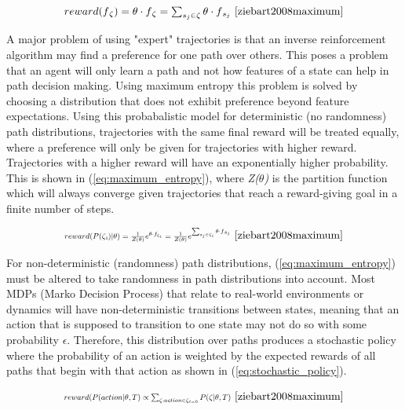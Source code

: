 \documentclass[12pt,american]{report}
\begin{document}
\begin{equation}
            \label{eq:feature_count_reward}
            \resizebox{0.44\textwidth}{!}{$reward(f\textsubscript{$\zeta$})= \theta \cdot f\textsubscript{$\zeta$} = \sum_{s_j\in\zeta}^{}\theta \cdot f\textsubscript{$s_j$}$}~\cite{ziebart2008maximum}
        \end{equation}

A major problem of using "expert" trajectories is that an inverse reinforcement algorithm may find a preference for one path over others.  This poses a problem that an agent will only learn a path and not how features of a state can help in path decision making.  Using maximum entropy this problem is solved by choosing a distribution that does not exhibit preference beyond feature expectations.  Using this probabalistic model for deterministic (no randomness) path distributions, trajectories with the same final reward will be treated equally, where a preference will only be given for trajectories with higher reward.  Trajectories with a higher reward will have an exponentially higher probability. This is shown in (\ref{eq:maximum_entropy}), where \textit{Z($\theta$)} is the partition function which will always converge given trajectories that reach a reward-giving goal in a finite number of steps.

\begin{equation}
            \label{eq:maximum_entropy}
            \resizebox{0.44\textwidth}{!}{$reward(P(\zeta\textsubscript{i})|\theta)= \frac{1}{Z(\theta)} e^{\theta \cdot f_{\zeta_i}}=  \frac{1}{Z(\theta)} e^{\sum_{s_j\in\zeta_i}^{}\theta \cdot f\textsubscript{$s_j$}}$}~\cite{ziebart2008maximum}%
        \end{equation}

For non-deterministic (randomness) path distributions, (\ref{eq:maximum_entropy}) must be altered to take randomness in path distributions into account. Most MDPs (Marko Decision Process) that relate to real-world environments or dynamics will have non-deterministic transitions between states, meaning that an action that is supposed to transition to one state may not do so with some probability $\epsilon$.  Therefore, this distribution over paths produces a stochastic policy where the probability of an action is weighted by the expected rewards of all paths that begin with that action as shown in (\ref{eq:stochastic_policy}).

\begin{equation}
            \label{eq:stochastic_policy}
            \resizebox{0.44\textwidth}{!}{$reward(P(action | \theta, T) \propto \sum_{\zeta:action\in\zeta_{t=0}}^{}P(\zeta | \theta, T)$}~\cite{ziebart2008maximum}%
        \end{equation}
\end{document}
